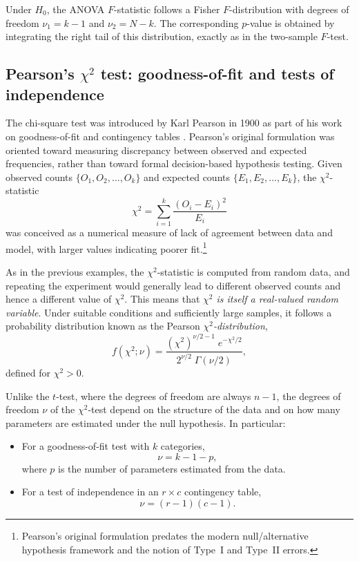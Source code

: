 \medskip

Under \(H_0\), the ANOVA \(F\)-statistic follows a Fisher \(F\)-distribution with degrees of freedom \(\nu_1=k-1\) and \(\nu_2=N-k\). The corresponding \(p\)-value is obtained by integrating the right tail of this distribution, exactly as in the two-sample \(F\)-test.

\subsection{Pearson’s \(\chi^{2}\) test: goodness-of-fit and tests of independence}

The chi-square test was introduced by Karl Pearson in 1900 as part of his work on goodness-of-fit and contingency tables \cite{pearson_1900_chisquare}. Pearson’s original formulation was oriented toward measuring discrepancy between observed and expected frequencies, rather than toward formal decision-based hypothesis testing. Given observed counts \(\{O_1,O_2,\dots,O_k\}\) and expected counts \(\{E_1,E_2,\dots,E_k\}\), the \(\chi^2\)-statistic
\begin{equation}
    \chi^2 = \sum_{i=1}^{k} \frac{(O_i - E_i)^2}{E_i}
    \label{chi2_statistic}
\end{equation}
was conceived as a numerical measure of lack of agreement between data and model, with larger values indicating poorer fit.\footnote{Pearson’s original formulation predates the modern null/alternative hypothesis framework and the notion of Type~I and Type~II errors.}

\medskip

As in the previous examples, the \(\chi^2\)-statistic is computed from random data, and repeating the experiment would generally lead to different observed counts and hence a different value of \(\chi^2\). This means that \textit{\(\chi^2\) is itself a real-valued random variable}. Under suitable conditions and sufficiently large samples, it follows a probability distribution known as the Pearson \textit{\(\chi^2\)-distribution},
\begin{equation}
    f(\chi^2;\nu)
    =
    \frac{(\chi^2)^{\nu/2-1} \; e^{-\chi^2/2}}
         {2^{\nu/2} \; \Gamma(\nu/2)},
    \label{chi2_distribution}
\end{equation}
defined for \(\chi^2>0\).

\medskip

Unlike the \(t\)-test, where the degrees of freedom are always \(n-1\), the degrees of freedom \(\nu\) of the \(\chi^2\)-test depend on the structure of the data and on how many parameters are estimated under the null hypothesis. In particular:
\begin{itemize}
    \item For a goodness-of-fit test with \(k\) categories,
    \[
        \nu = k - 1 - p,
    \]
    where \(p\) is the number of parameters estimated from the data.
    \item For a test of independence in an \(r\times c\) contingency table,
    \[
        \nu = (r-1)(c-1).
    \]
\end{itemize}


